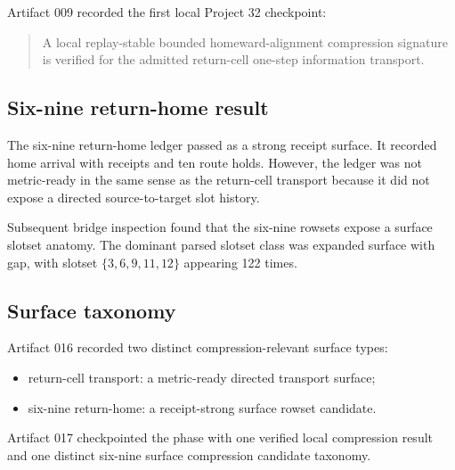 Artifact 009 recorded the first local Project 32 checkpoint:

\begin{quote}
A local replay-stable bounded homeward-alignment compression signature is
verified for the admitted return-cell one-step information transport.
\end{quote}

\subsection{Six-nine return-home result}

The six-nine return-home ledger passed as a strong receipt surface. It recorded
home arrival with receipts and ten route holds. However, the ledger was not
metric-ready in the same sense as the return-cell transport because it did not
expose a directed source-to-target slot history.

Subsequent bridge inspection found that the six-nine rowsets expose a surface
slotset anatomy. The dominant parsed slotset class was expanded surface with
gap, with slotset $\{3,6,9,11,12\}$ appearing 122 times.

\subsection{Surface taxonomy}

Artifact 016 recorded two distinct compression-relevant surface types:

\begin{itemize}
  \item return-cell transport: a metric-ready directed transport surface;
  \item six-nine return-home: a receipt-strong surface rowset candidate.
\end{itemize}

Artifact 017 checkpointed the phase with one verified local compression result
and one distinct six-nine surface compression candidate taxonomy.
